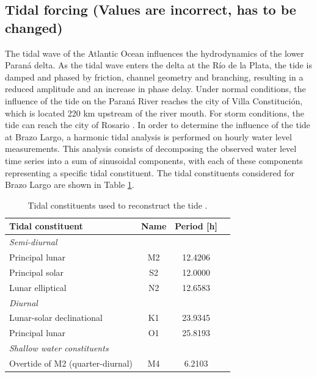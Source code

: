 \subsection{Tidal forcing (Values are incorrect, has to be changed)}
\label{sec:tidal forcing}
The tidal wave of the Atlantic Ocean influences the hydrodynamics of the lower Paraná delta. As the tidal wave enters the delta at the Río de la Plata, the tide is damped and phased by friction, channel geometry and branching, resulting in a reduced amplitude and an increase in phase delay. Under normal conditions, the influence of the tide on the Paraná River reaches the city of Villa Constitución, which is located 220 km upstream of the river mouth. For storm conditions, the tide can reach the city of Rosario \autocite{balayCausesPeriodicityLarge2018}. In order to determine the influence of the tide at Brazo Largo, a harmonic tidal analysis is performed on hourly water level measurements. This analysis consists of decomposing the observed water level time series into a sum of sinusoidal components, with each of these components representing a specific tidal constituent. The tidal constituents considered for Brazo Largo are shown in Table \ref{tab: constituents}.

\begin{table}[H]
\centering
\caption{Tidal constituents used to reconstruct the tide
\autocite{apelPrinciplesOceanPhysics1987}.}
\label{tab: constituents}
\begin{tabular}{lccc}
\hline
Tidal constituent & Name & Period [h] \\
\hline
\multicolumn{3}{l}{\textit{Semi-diurnal}} \\
\hspace{1em}Principal lunar & M2 & 12.4206\\
\hspace{1em}Principal solar & S2 & 12.0000 \\
\hspace{1em}Lunar elliptical & N2 & 12.6583\\
\hline
\multicolumn{3}{l}{\textit{Diurnal}} \\
\hspace{1em}Lunar-solar declinational & K1 & 23.9345  \\
\hspace{1em}Principal lunar & O1 & 25.8193  \\
\hline
\multicolumn{3}{l}{\textit{Shallow water constituents}} \\
\hspace{1em}Overtide of M2 (quarter-diurnal) & M4 & 6.2103  \\
\hline
\end{tabular}
\end{table}



